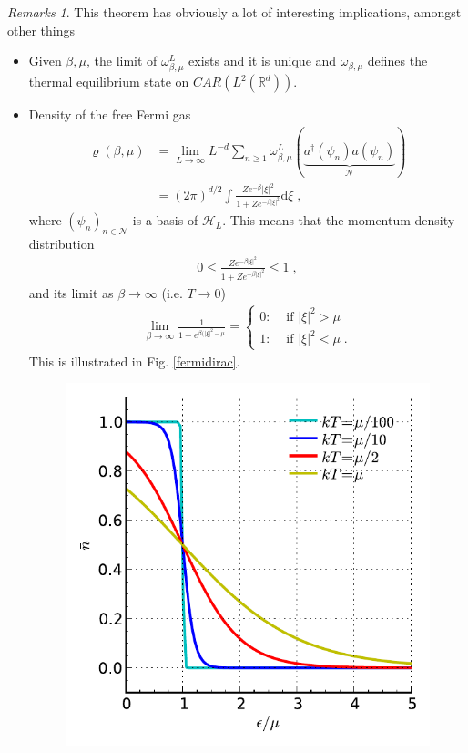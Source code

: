 \documentclass[
a4paper, %
11pt, %
onecolumn, %
openany, %
]{memoir}
\theoremstyle{definition}
\theoremstyle{remark}
\newtheorem{remarks}{Remarks}[chapter]
\theoremstyle{plain}
\begin{document}
\begin{remarks} This theorem has obviously a lot of interesting implications, amongst other things
	\begin{itemize}
		 \item Given $\beta,\mu$, the limit of $\omega_{\beta,\mu}^L$ exists and it is unique and $\omega_{\beta,\mu}$ defines the thermal equilibrium state on $CAR(L^2(\mathbb{R}^d))$.
		 \item Density of the free Fermi gas \begin{align}
		 \varrho(\beta,\mu)&=\lim_{L\rightarrow\infty}L^{-d}\sum_{n\geq 1} \omega_{\beta,\mu}^L(\underbrace{a^{\dagger}(\psi_n)a(\psi_n)}_{\mathcal{N}})\\
		 &=(2\pi)^{d/2}\int \frac{Ze^{-\beta}|\xi|^2}{1+Ze^{-\beta|\xi|^2}}\mathrm{d}\xi\; ,
		 \end{align}
		 where $(\psi_n)_{n\in\mathcal{N}}$ is a basis of $\mathcal{H}_L$. This means that the momentum density distribution \begin{align}
		 0\leq \frac{Ze^{-\beta|\xi|^2}}{1+Ze^{-\beta|\xi|^2}}\leq 1\; ,
		 \end{align}
		 and its limit as $\beta\rightarrow\infty$ (i.e. $T\rightarrow 0$) \begin{align}
		 \lim_{\beta\rightarrow \infty}\frac{1}{1+e^{\beta(|\xi|^2-\mu}}=\begin{cases}
		 0 :& \text{ if }|\xi|^2 > \mu\\
		 1 :& \text{ if }|\xi|^2< \mu \; .
		 \end{cases}
		 \end{align}
		 This is illustrated in Fig. \ref{fermidirac}. \begin{figure}\centering
		 	\includegraphics[scale=1]{fermidirac.pdf}

\end{figure}
\end{itemize}
\end{remarks}
\end{document}
